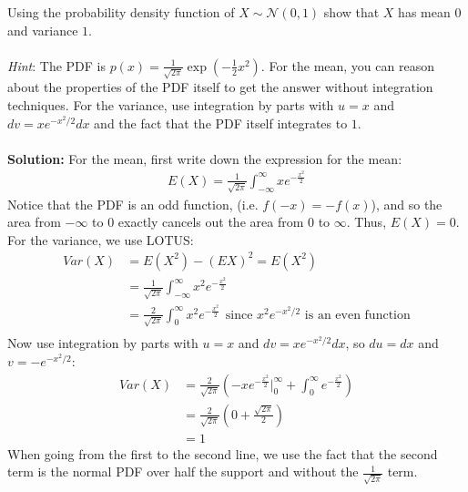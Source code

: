 \documentclass{harvardml}
\theoremstyle{definition}
\theoremstyle{plain}
\begin{document}
\begin{problem}
Using the probability density function of $X \sim \mathcal{N}(0, 1)$ show that $X$ has mean $0$ and variance $1$. \\
\\
\emph{Hint}: The PDF is $p(x) = \frac{1}{\sqrt{2\pi}} 
				\exp\left( -\frac{1}{2} x^2 \right).$ For the mean, you can reason about the properties of the PDF itself to get the answer without integration techniques. For the variance, use integration by parts with $u=x$ and $dv = xe^{-x^2/2} dx$ and the fact that the PDF itself integrates to $1$.
\\
\\
\textbf{Solution:} For the mean, first write down the expression for the mean: 
\begin{align*}
    E(X) = \frac{1}{\sqrt{2\pi}} \int_{-\infty}^{\infty} xe^{-\frac{x^2}{2}}
\end{align*}
Notice that the PDF is an odd function, (i.e. $f(-x) = -f(x)$), and so the area from $-\infty$ to $0$ exactly cancels out the area from $0$ to $\infty$. Thus, $E(X) = 0$.
\newline
For the variance, we use LOTUS:
\begin{align*}
    Var(X) &= E(X^2) - (EX)^2 = E(X^2) \\
    &= \frac{1}{\sqrt{2\pi}} \int_{-\infty}^{\infty} x^2e^{-\frac{x^2}{2}} \\
        &= \frac{2}{\sqrt{2\pi}} \int_{0}^{\infty} x^2e^{-\frac{x^2}{2}} \hspace{5pt} \text{since $x^2e^{-x^2/2}$ is an even function}\\
\end{align*}
Now use integration by parts with $u = x$ and $dv = xe^{-x^2/2}dx$, so $du = dx$ and $v = -e^{-x^2/2}$:
\begin{align*}
    Var(X) &= \frac{2}{\sqrt{2\pi}} (-x e^{-\frac{x^2}{2}}\Big|_0^{\infty} + \int_{0}^{\infty} e^{-\frac{x^2}{2}})\\
    &= \frac{2}{\sqrt{2\pi}}(0 + \frac{\sqrt{2\pi}}{2}) \\
    &= 1
\end{align*}
When going from the first to the second line, we use the fact that the second term is the normal PDF over half the support and without the $\frac{1}{\sqrt{2\pi}}$ term. 
\end{problem}
\end{document}

